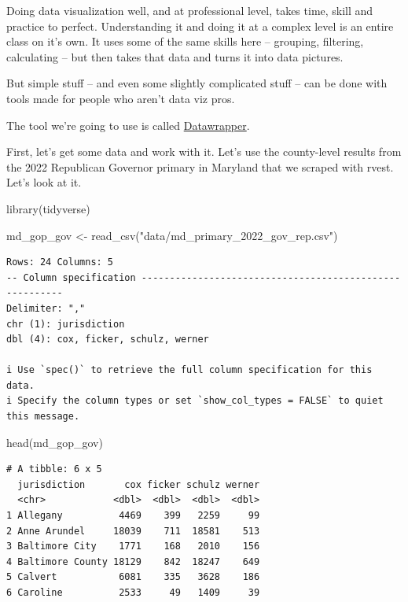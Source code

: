 \documentclass[
  letterpaper,
  DIV=11,
  numbers=noendperiod]{scrreprt}
\newenvironment{Shaded}{\begin{snugshade}}{\end{snugshade}}
\newcommand{\FunctionTok}[1]{\textcolor[rgb]{0.28,0.35,0.67}{#1}}
\newcommand{\NormalTok}[1]{\textcolor[rgb]{0.00,0.23,0.31}{#1}}
\newcommand{\OtherTok}[1]{\textcolor[rgb]{0.00,0.23,0.31}{#1}}
\newcommand{\StringTok}[1]{\textcolor[rgb]{0.13,0.47,0.30}{#1}}
\begin{document}
Doing data visualization well, and at professional level, takes time,
skill and practice to perfect. Understanding it and doing it at a
complex level is an entire class on it's own. It uses some of the same
skills here -- grouping, filtering, calculating -- but then takes that
data and turns it into data pictures.

But simple stuff -- and even some slightly complicated stuff -- can be
done with tools made for people who aren't data viz pros.

The tool we're going to use is called
\href{https://www.datawrapper.de/}{Datawrapper}.

First, let's get some data and work with it. Let's use the county-level
results from the 2022 Republican Governor primary in Maryland that we
scraped with rvest. Let's look at it.

\begin{Shaded}
\begin{Highlighting}[]
\FunctionTok{library}\NormalTok{(tidyverse)}
\end{Highlighting}
\end{Shaded}

\begin{Shaded}
\begin{Highlighting}[]
\NormalTok{md\_gop\_gov }\OtherTok{\textless{}{-}} \FunctionTok{read\_csv}\NormalTok{(}\StringTok{"data/md\_primary\_2022\_gov\_rep.csv"}\NormalTok{)}
\end{Highlighting}
\end{Shaded}

\begin{verbatim}
Rows: 24 Columns: 5
-- Column specification --------------------------------------------------------
Delimiter: ","
chr (1): jurisdiction
dbl (4): cox, ficker, schulz, werner

i Use `spec()` to retrieve the full column specification for this data.
i Specify the column types or set `show_col_types = FALSE` to quiet this message.
\end{verbatim}

\begin{Shaded}
\begin{Highlighting}[]
\FunctionTok{head}\NormalTok{(md\_gop\_gov)}
\end{Highlighting}
\end{Shaded}

\begin{verbatim}
# A tibble: 6 x 5
  jurisdiction       cox ficker schulz werner
  <chr>            <dbl>  <dbl>  <dbl>  <dbl>
1 Allegany          4469    399   2259     99
2 Anne Arundel     18039    711  18581    513
3 Baltimore City    1771    168   2010    156
4 Baltimore County 18129    842  18247    649
5 Calvert           6081    335   3628    186
6 Caroline          2533     49   1409     39
\end{verbatim}
\end{document}
